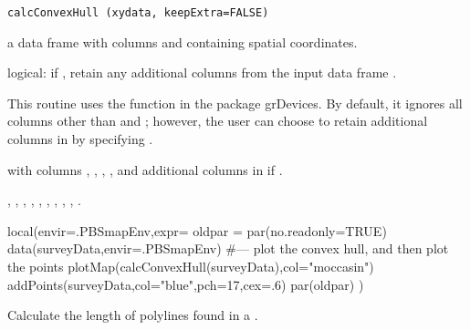 \documentclass[letterpaper]{book}
\begin{document}
%
\begin{Usage}
\begin{verbatim}
calcConvexHull (xydata, keepExtra=FALSE)
\end{verbatim}
\end{Usage}
%
\begin{Arguments}
\begin{ldescription}
\item[\code{xydata}] a data frame with columns  and 
containing spatial coordinates.
\item[\code{keepExtra}] logical: if , retain any additional columns
from the input data frame .
\end{ldescription}
\end{Arguments}
%
\begin{Details}\relax
This routine uses the function  in the package grDevices.
By default, it ignores all columns other than  and ;
however, the user can choose to retain additional columns in 
by specifying . 
\end{Details}
%
\begin{Value}
 with columns , , , ,
and additional columns in  if .
\end{Value}
%
\begin{SeeAlso}\relax
{},
,
,
,
,
,
,
,
,
.
\end{SeeAlso}
%
\begin{Examples}
\begin{ExampleCode}
local(envir=.PBSmapEnv,expr={
  oldpar = par(no.readonly=TRUE)
  data(surveyData,envir=.PBSmapEnv)
  #--- plot the convex hull, and then plot the points
  plotMap(calcConvexHull(surveyData),col="moccasin")
  addPoints(surveyData,col="blue",pch=17,cex=.6)
  par(oldpar)
})
\end{ExampleCode}
\end{Examples}
%
\begin{Description}\relax
Calculate the length of polylines found in a .
\end{Description}
\end{document}

